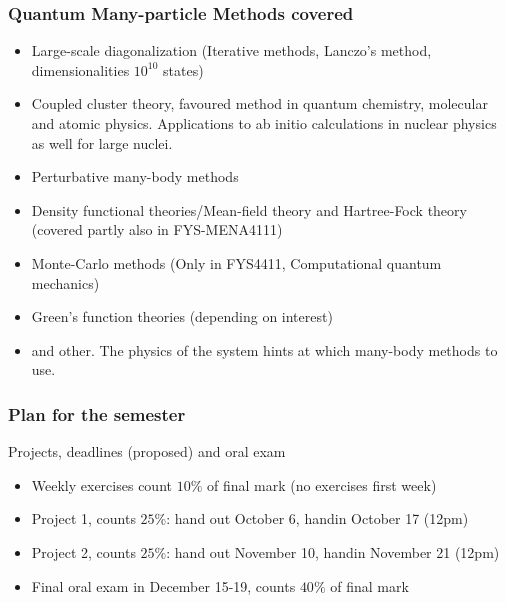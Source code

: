 \documentclass{beamer}
\begin{document}
\begin{frame}
\frametitle{Quantum Many-particle Methods covered}

\begin{block}{}
\begin{itemize}
\item Large-scale diagonalization (Iterative methods, Lanczo's method, dimensionalities $10^{10}$ states)

\item Coupled cluster theory, favoured method in quantum chemistry, molecular and atomic physics. Applications to ab initio calculations in nuclear physics as well for large nuclei.

\item Perturbative many-body methods 

\item Density functional theories/Mean-field theory and Hartree-Fock theory (covered partly also in FYS-MENA4111)

\item Monte-Carlo methods (Only in FYS4411, Computational quantum mechanics)

\item Green's function theories (depending on interest)

\item and other. The physics of the system hints at which many-body methods to use.
\end{itemize}

\noindent
\end{block}
\end{frame}

\begin{frame}
\frametitle{Plan for the semester}

\begin{block}{Projects, deadlines (proposed) and oral exam }
\begin{itemize}
\item Weekly exercises count $10\%$ of final mark (no exercises  first week)

\item Project 1, counts $25\%$: hand out October 6, handin October 17 (12pm)

\item Project 2, counts $25\%$: hand out November 10, handin November 21 (12pm)

\item Final oral exam in December 15-19, counts $40\%$ of final mark
\end{itemize}

\noindent
\end{block}
\end{frame}
\end{document}
